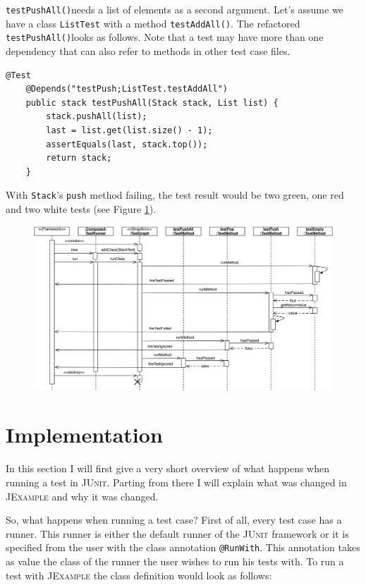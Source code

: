 \documentclass[11pt,a4paper,pdftex]{article}
\newcommand{\JUnit}{\textsc{JUnit}\xspace}
\newcommand{\JExample}{\textsc{JExample}\xspace}
\newcommand{\ttt}[1]{\texttt{#1}}
\newcommand{\testPushAll}{\ttt{testPushAll()}}
\begin{document}
\testPushAll needs a list of elements as a second argument. Let's assume we have a class \ttt{ListTest} with a method \ttt{testAddAll()}. The refactored \testPushAll looks as follows. Note that a test may have more than one dependency that can also refer to methods in other test case files.

\begin{lstlisting}[label=lst:testpushall,caption=A test may have multiple dependencies.]
    @Test
    @Depends("testPush;ListTest.testAddAll")
    public stack testPushAll(Stack stack, List list) {
        stack.pushAll(list);
        last = list.get(list.size() - 1);
        assertEquals(last, stack.top());
        return stack;
    }
\end{lstlisting}

With \ttt{Stack}'s \ttt{push} method failing, the test result would be two green, one red and two white tests (see Figure \ref{fig:testPush}).

\begin{figure}[htbp]
 \includegraphics[width=15.0cm]{testPush.pdf}
 \caption{}
 \label{fig:testPush}
\end{figure}

\section{Implementation}

In this section I will first give a very short overview of what happens when running a test in \JUnit. Parting from there I will explain what was changed in \JExample and why it was changed.

So, what happens when running a test case? First of all, every test case has a runner. This runner is either the default runner of the \JUnit framework or it is specified from the user with the class annotation \ttt{@RunWith}. This annotation takes as value the class of the runner the user wishes to run his tests with. To run a test with \JExample the class definition would look as follows: 
\end{document}
